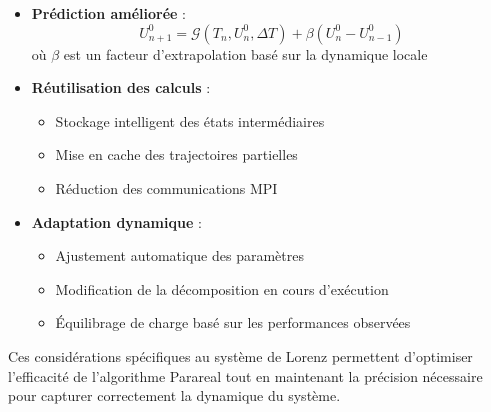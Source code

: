 \begin{itemize}
    \item \textbf{Prédiction améliorée} :
    \begin{equation}
    U_{n+1}^0 = \mathcal{G}(T_n, U_n^0, \Delta T) + \beta(U_n^0 - U_{n-1}^0)
    \end{equation}
    où $\beta$ est un facteur d'extrapolation basé sur la dynamique locale

    \item \textbf{Réutilisation des calculs} :
    \begin{itemize}
        \item Stockage intelligent des états intermédiaires
        \item Mise en cache des trajectoires partielles
        \item Réduction des communications MPI
    \end{itemize}

    \item \textbf{Adaptation dynamique} :
    \begin{itemize}
        \item Ajustement automatique des paramètres
        \item Modification de la décomposition en cours d'exécution
        \item Équilibrage de charge basé sur les performances observées
    \end{itemize}
\end{itemize}

Ces considérations spécifiques au système de Lorenz permettent d'optimiser l'efficacité de l'algorithme Parareal tout en maintenant la précision nécessaire pour capturer correctement la dynamique du système.